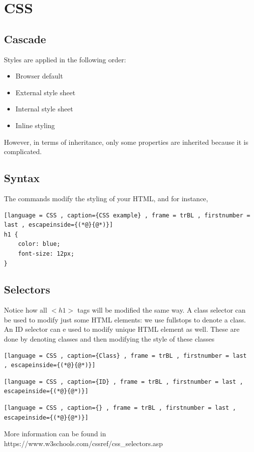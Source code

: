 \documentclass[a4paper]{article}
\theoremstyle{plain}
\theoremstyle{definition}
\theoremstyle{remark}
\begin{document}
\begin{flushleft}
\begin{itemize}
\end{itemize}

\section{CSS}
\subsection{Cascade}
Styles are applied in the following order:
\begin{itemize}
	\item Browser default
	\item External style sheet
	\item Internal style sheet
	\item Inline styling
\end{itemize}
However, in terms of inheritance, only some properties are inherited because it is complicated.
\subsection{Syntax}
The commands modify the styling of your HTML, and for instance,
\begin{lstlisting}[language = CSS , caption={CSS example} , frame = trBL , firstnumber = last , escapeinside={(*@}{@*)}]
h1 {
	color: blue;
	font-size: 12px;
}
\end{lstlisting}
\subsection{Selectors}
Notice how all $<h1> $ tags will be modified the same way. A class selector can be used to modify just some HTML elements: we use fullstops to denote a class. An ID selector can e used to modify unique HTML element as well. These are done by denoting classes and then modifying the style of these classes
\begin{lstlisting}[language = CSS , caption={Class} , frame = trBL , firstnumber = last , escapeinside={(*@}{@*)}]

\end{lstlisting}
\begin{lstlisting}[language = CSS , caption={ID} , frame = trBL , firstnumber = last , escapeinside={(*@}{@*)}]

\end{lstlisting}
\begin{lstlisting}[language = CSS , caption={} , frame = trBL , firstnumber = last , escapeinside={(*@}{@*)}]
\end{lstlisting}
More information can be found in https://www.w3schools.com/cssref/css_selectors.asp

\end{flushleft}
\end{document}
